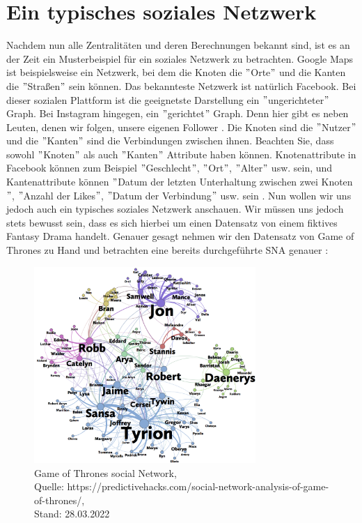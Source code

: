 \section{Ein typisches soziales Netzwerk}
Nachdem nun alle Zentralitäten und deren Berechnungen bekannt sind, ist es an der Zeit ein Musterbeispiel für ein soziales Netzwerk zu betrachten. Google Maps ist beispielsweise ein Netzwerk, bei dem die Knoten die $"$Orte$"$ und die Kanten die $"$Straßen$"$ sein können. Das bekannteste Netzwerk ist natürlich Facebook. Bei dieser sozialen Plattform ist die geeignetste Darstellung ein $"$ungerichteter$"$ Graph. Bei Instagram hingegen, ein $"$gerichtet$"$ Graph. Denn hier gibt es neben Leuten, denen wir folgen, unsere eigenen Follower \cite{fbInsta}. Die Knoten sind die $"$Nutzer$"$ und die $"$Kanten$"$ sind die Verbindungen zwischen ihnen. Beachten Sie, dass sowohl $"$Knoten$"$ als auch $"$Kanten$"$ Attribute haben können. Knotenattribute in Facebook können zum Beispiel $"$Geschlecht$"$, $"$Ort$"$, $"$Alter$"$ usw. sein, und Kantenattribute können $"$Datum der letzten Unterhaltung zwischen zwei Knoten$"$, $"$Anzahl der Likes$"$, $"$Datum der Verbindung$"$ usw. sein \cite{GOT}.
Nun wollen wir uns jedoch auch ein typisches soziales Netzwerk anschauen. Wir müssen uns jedoch stets bewusst sein, dass es sich hierbei um einen Datensatz von einem fiktives Fantasy Drama handelt. Genauer gesagt nehmen wir den Datensatz von Game of Thrones zu Hand und betrachten eine bereits durchgeführte SNA genauer \cite{GOT}:

\begin{figure}[h!]
    \centering
    \includegraphics[width=0.75\textwidth]{Graphics/got-network.png}
    \caption{Game of Thrones social Network,\\
    Quelle: https://predictivehacks.com/social-network-analysis-of-game-of-thrones/,\\ Stand: 28.03.2022}
    \label{fig:GameOfThrones}
\end{figure}

